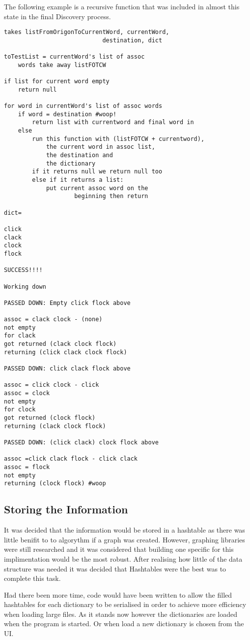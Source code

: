 \documentclass[final,a4paper,twoside,12pt]{report}
\begin{document}
The following example is a recursive function that was included
in almost this state in the final Discovery process.
\begin{verbatim}
takes listFromOrigonToCurrentWord, currentWord, 
							destination, dict

toTestList = currentWord's list of assoc 
	words take away listFOTCW

if list for current word empty
	return null

for word in currentWord's list of assoc words
	if word = destination #woop!
		return list with currentword and final word in
	else
		run this function with (listFOTCW + currentword), 
			the current word in assoc list,
			the destination and
			the dictionary
		if it returns null we return null too
		else if it returns a list:
			put current assoc word on the
					beginning then return

dict=

click
clack
clock
flock

SUCCESS!!!!

Working down

PASSED DOWN: Empty click flock above

assoc = clack clock - (none)
not empty
for clack
got returned (clack clock flock)
returning (click clack clock flock)

PASSED DOWN: click clack flock above

assoc = click clock - click
assoc = clock
not empty
for clock
got returned (clock flock)
returning (clack clock flock)

PASSED DOWN: (click clack) clock flock above

assoc =click clack flock - click clack
assoc = flock
not empty
returning (clock flock) #woop
\end{verbatim}

\subsection{Storing the Information}
It was decided that the information would be stored in a hashtable
as there was little benifit to to algorythm if a graph was created.
However, graphing libraries were still researched and it was considered
that building one specific for this implimentation would be the most
robust. After realising how little of the data structure was needed
it was decided that Hashtables were the best was to complete this task.

Had there been more time, code would have been written to allow the
filled hashtables for each dictionary to be serialised in order to
achieve more efficiency when loading large files. As it stands now
however the dictionaries are loaded when the program is started.
Or when load a new dictionary is chosen from the UI.
\end{document}
